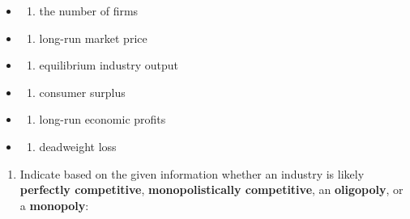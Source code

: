 \documentclass[
  11pt,
]{article}
\providecommand{\tightlist}{%
  \setlength{\itemsep}{0pt}\setlength{\parskip}{0pt}}
\begin{document}
\begin{itemize}
\item
  \begin{enumerate}
  \def\labelenumi{\roman{enumi}.}
  \tightlist
  \item
    the number of firms
  \end{enumerate}
\item
  \begin{enumerate}
  \def\labelenumi{\roman{enumi}.}
  \setcounter{enumi}{1}
  \tightlist
  \item
    long-run market price
  \end{enumerate}
\item
  \begin{enumerate}
  \def\labelenumi{\roman{enumi}.}
  \setcounter{enumi}{2}
  \tightlist
  \item
    equilibrium industry output
  \end{enumerate}
\item
  \begin{enumerate}
  \def\labelenumi{\roman{enumi}.}
  \setcounter{enumi}{3}
  \tightlist
  \item
    consumer surplus
  \end{enumerate}
\item
  \begin{enumerate}
  \def\labelenumi{\alph{enumi}.}
  \setcounter{enumi}{21}
  \tightlist
  \item
    long-run economic profits
  \end{enumerate}
\item
  \begin{enumerate}
  \def\labelenumi{\roman{enumi}.}
  \setcounter{enumi}{5}
  \tightlist
  \item
    deadweight loss
  \end{enumerate}
\end{itemize}

\clearpage

\begin{enumerate}
\def\labelenumi{\arabic{enumi}.}
\setcounter{enumi}{1}
\tightlist
\item
  Indicate based on the given information whether an industry is likely
  \textbf{perfectly competitive}, \textbf{monopolistically competitive},
  an \textbf{oligopoly}, or a \textbf{monopoly}:
\end{enumerate}
\end{document}
